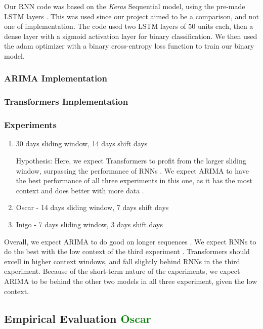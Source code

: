 \documentclass[12pt, letterpaper]{article}
\begin{document}
Our RNN code was based on the \textit{Keras} Sequential model, using the pre-made LSTM layers \cite{keras2024lstm,keras2024sequential}. This was used since our project aimed to be a comparison, and not one of implementation. 
The code used two LSTM layers of 50 units each, then a dense layer with a sigmoid activation layer for binary classification. We then used the adam optimizer with a binary cross-entropy loss function to train our binary model.

\subsubsection*{ARIMA Implementation}

\subsubsection*{Transformers Implementation}

\subsubsection*{Experiments}
    \begin{enumerate}
        \item 30 days sliding window, 14 days shift days
            
            Hypothesis: Here, we expect Transformers to profit from the larger sliding window, surpassing the performance of RNNs \cite{greff2017, sp500arimalstmregression}. We expect ARIMA to have the best performance of all three experiments in this one, as it has the most context and does better with more data \cite{ho2021}.
        \item Oscar - 14 days sliding window, 7 days shift days
        \item Inigo - 7 days sliding window, 3 days shift days
    \end{enumerate}

    
Overall, we expect ARIMA to do good on longer sequences \cite{ho2021}. We expect RNNs to do the best with the low context of the third experiment \cite{Hansika}. Transformers should excell in higher context windows, and fall slightly behind RNNs in the third experiment. Because of the short-term nature of the experiments, we expect ARIMA to be behind the other two models in all three experiment, given the low context.
\subsection*{Empirical Evaluation \textcolor{green}{Oscar}}
\end{document}
